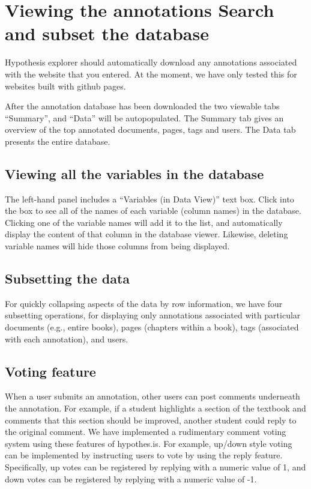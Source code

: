 \documentclass[]{book}
\theoremstyle{definition}
\theoremstyle{definition}
\theoremstyle{definition}
\theoremstyle{remark}
\begin{document}
\section{Viewing the annotations Search and subset the
database}\label{viewing-the-annotations-search-and-subset-the-database}

Hypothesis explorer should automatically download any annotations
associated with the website that you entered. At the moment, we have
only tested this for websites built with github pages.

After the annotation database has been downloaded the two viewable tabs
``Summary'', and ``Data'' will be autopopulated. The Summary tab gives
an overview of the top annotated documents, pages, tags and users. The
Data tab presents the entire database.

\subsection{Viewing all the variables in the
database}\label{viewing-all-the-variables-in-the-database}

The left-hand panel includes a ``Variables (in Data View)'' text box.
Click into the box to see all of the names of each variable (column
names) in the database. Clicking one of the variable names will add it
to the list, and automatically display the content of that column in the
database viewer. Likewise, deleting variable names will hide those
columns from being displayed.

\subsection{Subsetting the data}\label{subsetting-the-data}

For quickly collapsing aspects of the data by row information, we have
four subsetting operations, for displaying only annotations associated
with particular documents (e.g., entire books), pages (chapters within a
book), tags (associated with each annotation), and users.

\subsection{Voting feature}\label{voting-feature}

When a user submits an annotation, other users can post comments
underneath the annotation. For example, if a student highlights a
section of the textbook and comments that this section should be
improved, another student could reply to the original comment. We have
implemented a rudimentary comment voting system using these features of
hypothes.is. For example, up/down style voting can be implemented by
instructing users to vote by using the reply feature. Specifically, up
votes can be registered by replying with a numeric value of 1, and down
votes can be registered by replying with a numeric value of -1.
\end{document}
